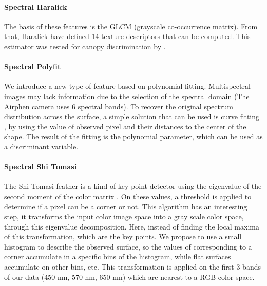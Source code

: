 \documentclass[../thesis.tex]{subfiles}
\begin{document}
    \paragraph{Spectral Haralick} The basis of these features is the GLCM (grayscale co-occurrence matrix). From that, Haralick have defined 14 texture descriptors that can be computed. This estimator was tested for canopy discrimination by \cite{wong2013co}.
    
    \paragraph{Spectral Polyfit} We introduce a new type of feature based on polynomial fitting. Multispectral images may lack information due to the selection of the spectral domain (The Airphen camera uses 6 spectral bands). To recover the original spectrum distribution across the surface, a simple solution that can be used is curve fitting \cite{1634723}, by using the value of observed pixel and their distances to the center of the shape. The result of the fitting is the polynomial parameter, which can be used as a discriminant variable.
    
    
    \paragraph{Spectral Shi Tomasi} The Shi-Tomasi feather is a kind of key point detector using the eigenvalue of the second moment of the color matrix \cite{harris1988combined}. On these values, a threshold is applied to determine if a pixel can be a corner or not. This algorithm has an interesting step, it transforms the input color image space into a gray scale color space, through this eigenvalue decomposition. Here, instead of finding the local maxima of this transformation, which are the key points. We propose to use a small histogram to describe the observed surface, so the values of corresponding to a corner accumulate in a specific bins of the histogram, while flat surfaces accumulate on other bins, etc. This transformation is applied on the first 3 bands of our data (450 nm, 570 nm, 650 nm) which are nearest to a RGB color space.
    
    
\end{document}
